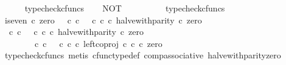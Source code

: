 \begin{isabellebody}
\ \ \ \ \isamarkupfalse%
\ typecheck{\isacharunderscore}{\kern0pt}cfuncs\isanewline
\ \ \isamarkupfalse%
\ {\isachardoublequoteopen}NOT\ {\isacharcolon}{\kern0pt}\ {\isasymOmega}\ {\isasymrightarrow}\ {\isasymOmega}{\isachardoublequoteclose}\isanewline
\ \ \ \ \isamarkupfalse%
\ typecheck{\isacharunderscore}{\kern0pt}cfuncs\isanewline
\isanewline
\ \ \isamarkupfalse%
\ {\isachardoublequoteopen}is{\isacharunderscore}{\kern0pt}even\ {\isasymcirc}\isactrlsub c\ zero\ {\isacharequal}{\kern0pt}\ {\isacharparenleft}{\kern0pt}{\isacharparenleft}{\kern0pt}{\isasymt}\ {\isasymcirc}\isactrlsub c\ {\isasymbeta}\isactrlbsub {\isasymnat}\isactrlsub c\isactrlesub {\isacharparenright}{\kern0pt}\ {\isasymamalg}\ {\isacharparenleft}{\kern0pt}{\isasymf}\ {\isasymcirc}\isactrlsub c\ {\isasymbeta}\isactrlbsub {\isasymnat}\isactrlsub c\isactrlesub {\isacharparenright}{\kern0pt}\ {\isasymcirc}\isactrlsub c\ halve{\isacharunderscore}{\kern0pt}with{\isacharunderscore}{\kern0pt}parity{\isacharparenright}{\kern0pt}\ {\isasymcirc}\isactrlsub c\ zero{\isachardoublequoteclose}\isanewline
\ \ \isamarkupfalse%
\ {\isacharminus}{\kern0pt}\isanewline
\ \ \ \ \isamarkupfalse%
\ {\isachardoublequoteopen}{\isacharparenleft}{\kern0pt}{\isacharparenleft}{\kern0pt}{\isasymt}\ {\isasymcirc}\isactrlsub c\ {\isasymbeta}\isactrlbsub {\isasymnat}\isactrlsub c\isactrlesub {\isacharparenright}{\kern0pt}\ {\isasymamalg}\ {\isacharparenleft}{\kern0pt}{\isasymf}\ {\isasymcirc}\isactrlsub c\ {\isasymbeta}\isactrlbsub {\isasymnat}\isactrlsub c\isactrlesub {\isacharparenright}{\kern0pt}\ {\isasymcirc}\isactrlsub c\ halve{\isacharunderscore}{\kern0pt}with{\isacharunderscore}{\kern0pt}parity{\isacharparenright}{\kern0pt}\ {\isasymcirc}\isactrlsub c\ zero\isanewline
\ \ \ \ \ \ {\isacharequal}{\kern0pt}\ {\isacharparenleft}{\kern0pt}{\isasymt}\ {\isasymcirc}\isactrlsub c\ {\isasymbeta}\isactrlbsub {\isasymnat}\isactrlsub c\isactrlesub {\isacharparenright}{\kern0pt}\ {\isasymamalg}\ {\isacharparenleft}{\kern0pt}{\isasymf}\ {\isasymcirc}\isactrlsub c\ {\isasymbeta}\isactrlbsub {\isasymnat}\isactrlsub c\isactrlesub {\isacharparenright}{\kern0pt}\ {\isasymcirc}\isactrlsub c\ left{\isacharunderscore}{\kern0pt}coproj\ {\isasymnat}\isactrlsub c\ {\isasymnat}\isactrlsub c\ {\isasymcirc}\isactrlsub c\ zero{\isachardoublequoteclose}\isanewline
\ \ \ \ \ \ \isamarkupfalse%
\ {\isacharparenleft}{\kern0pt}typecheck{\isacharunderscore}{\kern0pt}cfuncs{\isacharcomma}{\kern0pt}\ metis\ cfunc{\isacharunderscore}{\kern0pt}type{\isacharunderscore}{\kern0pt}def\ comp{\isacharunderscore}{\kern0pt}associative\ halve{\isacharunderscore}{\kern0pt}with{\isacharunderscore}{\kern0pt}parity{\isacharunderscore}{\kern0pt}zero{\isacharparenright}{\kern0pt}\isanewline

\end{isabellebody}

